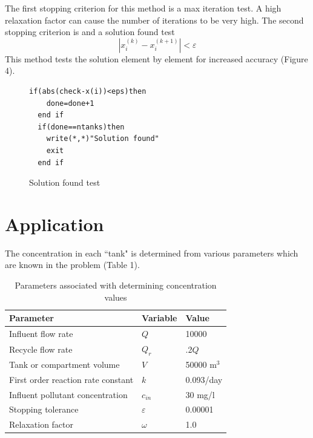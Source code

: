 \documentclass[titlepage,12pt]{article}
\begin{document}
The first stopping criterion for this method is a max iteration
test.  A high relaxation factor can cause the number of iterations
to be very high. The second stopping criterion is and a solution
found test
\begin{equation}
|x_i^{(k)}-x_i^{(k+1)}|<\varepsilon
\end{equation}
This method tests the solution element by element for increased
accuracy (Figure 4).

\begin{figure}[h] \label{fig:solution}
\begin{center}
\begin{Verbatim}[frame=single]
  if(abs(check-x(i))<eps)then
    done=done+1
  end if
  if(done==ntanks)then
    write(*,*)"Solution found"
    exit
  end if
\end{Verbatim}
\caption{Solution found test}
\end{center}
\end{figure}

\section{Application}
The concentration in each ``tank" is determined from various
parameters which are known in the problem (Table 1).

\begin{table}[h]
\begin{center}
\caption{Parameters associated with determining concentration
values}
\begin{tabular}{|l|l|l|}
\hline
{\bf Parameter} & {\bf Variable} & {\bf Value} \\
\hline
Influent flow rate  &        $Q$ &      10000 \\
\hline
Recycle flow rate &      $Q_r$ &      .2$Q$ \\
\hline
Tank or compartment volume &        $V$ & 50000 m$^3$ \\
\hline
First order reaction rate constant &        $k$ &  0.093/day \\
\hline
Influent pollutant concentration &   $c_{in}$ &    30 mg/l \\
\hline
Stopping tolerance  & $\varepsilon$ &    0.00001 \\
\hline
Relaxation factor &   $\omega$ &        1.0 \\
\hline
\end{tabular}
\end{center}
\end{table}
\end{document}
